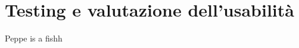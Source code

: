 \chapter{Testing e valutazione dell’usabilità}
\label{cha:Testing e valutazione dell’usabilità}
Peppe is a  fishh


\lipsum[1-4]